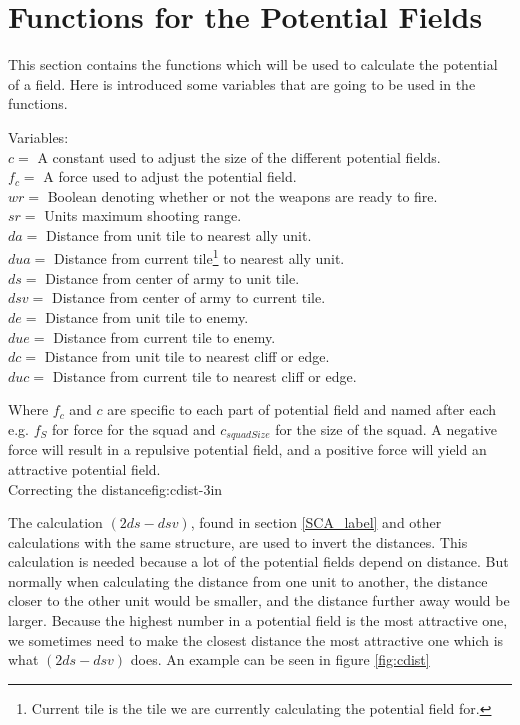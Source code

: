 \section{Functions for the Potential Fields}
	This section contains the functions which will be used to calculate the potential of a field. Here is introduced some variables that 
	are going to be used in the functions.
	
	\label{cha3_variables}
	Variables:\\
	$c =$ A constant used to adjust the size of the different potential fields.\\ 
	$f_c =$ A force used to adjust the potential field.\\
	$wr =$ Boolean denoting whether or not the weapons are ready to fire.\\
	$sr =$ Units maximum shooting range.\\
	$da =$ Distance from unit tile to nearest ally unit.\\
	$dua =$ Distance from current tile\footnote{Current tile is the tile we are currently calculating the potential field for.} to nearest ally unit.\\
	$ds =$ Distance from center of army to unit tile.\\
	$dsv =$ Distance from center of army to current tile.\\
	$de =$ Distance from unit tile to enemy.\\
	$due =$ Distance from current tile to enemy.\\
	$dc =$ Distance from unit tile to nearest cliff or edge. \\
	$duc =$ Distance from current tile to nearest cliff or edge. 
	
	
	
	Where $f_c$ and $c$ are specific to each part of potential field and named after each e.g. $f_{S}$ for force for the squad and $c_{squadSize}$ for the size of the squad. A negative force will result in a repulsive potential field, and a positive force will yield an attractive potential field.\\
	
		    {Correcting the distance}{fig:cdist}{-3in}
			
	The calculation $(2ds - dsv)$, found in section \ref{SCA_label} and other calculations with the same structure, are used to invert the distances. This calculation is needed because a lot of the potential fields depend on distance. But normally when calculating the distance from one unit to another, the distance closer to the other unit would be smaller, and the distance further away would be larger. Because the highest number in a potential field is the most attractive one, we sometimes need to make the closest distance the most attractive one which is what $(2ds - dsv)$ does. An example can be seen in figure \ref{fig:cdist}
	\pagebreak
